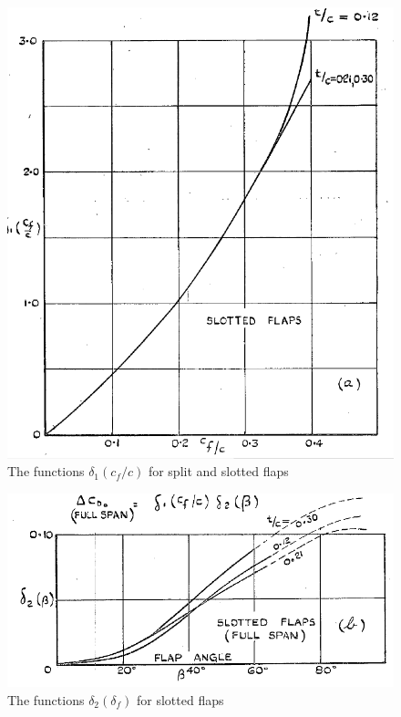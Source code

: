 %
\begin{figure}[H]
\centering
\includegraphics[width=0.7\linewidth]{Delta1_Slotted}
\caption{The functions $\delta_1\left(c_f/c\right)$ for split and slotted flaps}
\label{fig:Delta2Plain}
\end{figure}
%
\begin{figure}[H]
\centering
\includegraphics[width=0.7\linewidth]{Delta2_Slotted}
\caption{The functions $\delta_2\left(\delta_f\right)$ for slotted flaps}
\label{fig:Delta2Slotted}
\end{figure}

